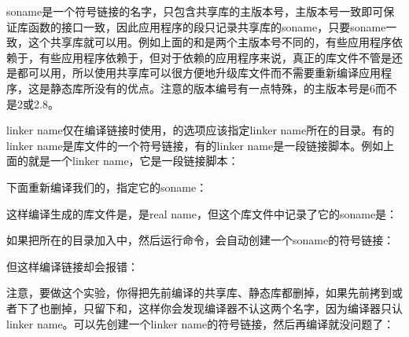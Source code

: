 soname是一个符号链接的名字，只包含共享库的主版本号，主版本号一致即可保证库函数的接口一致，因此应用程序的段只记录共享库的soname，只要soname一致，这个共享库就可以用。例如上面的和是两个主版本号不同的，有些应用程序依赖于，有些应用程序依赖于，但对于依赖的应用程序来说，真正的库文件不管是还是都可以用，所以使用共享库可以很方便地升级库文件而不需要重新编译应用程序，这是静态库所没有的优点。注意的版本编号有一点特殊，的主版本号是6而不是2或2.\BookSplit{}8。



linker name仅在编译链接时使用，的选项应该指定linker name所在的目录。有的linker name是库文件的一个符号链接，有的linker name是一段链接脚本。例如上面的就是一个linker name，它是一段链接脚本：




下面重新编译我们的，指定它的soname：




这样编译生成的库文件是，是real name，但这个库文件中记录了它的soname是：




如果把所在的目录加入中，然后运行命令，会自动创建一个soname的符号链接：




但这样编译链接却会报错：




注意，要做这个实验，你得把先前编译的共享库、静态库都删掉，如果先前拷到或者下了也删掉，只留下和，这样你会发现编译器不认这两个名字，因为编译器只认linker name。可以先创建一个linker name的符号链接，然后再编译就没问题了：


